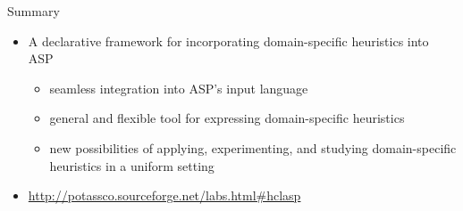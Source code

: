 \begin{block}{Summary}
  \begin{itemize}
    \bigskip %


  \item A declarative framework for incorporating domain-specific heuristics into ASP
    \begin{itemize}
    \item seamless integration into ASP's input language
    \item general and flexible tool for expressing domain-specific heuristics
    \item new possibilities of applying, experimenting, and studying
      domain-specific heuristics in a uniform setting
    \end{itemize}

    \bigskip
  \item \url{http://potassco.sourceforge.net/labs.html\#hclasp}


  \end{itemize}
\end{block}


